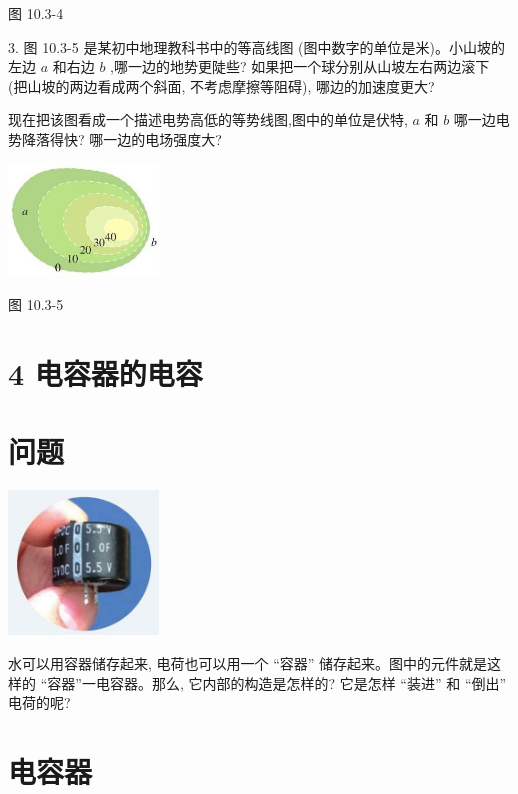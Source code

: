 \documentclass[10pt]{article}
\begin{document}
图 10.3-4

3. 图 10.3-5 是某初中地理教科书中的等高线图 (图中数字的单位是米)。小山坡的左边 \(a\) 和右边 \(b\) ,哪一边的地势更陡些? 如果把一个球分别从山坡左右两边滚下 (把山坡的两边看成两个斜面, 不考虑摩擦等阻碍), 哪边的加速度更大?

现在把该图看成一个描述电势高低的等势线图,图中的单位是伏特, \(a\) 和 \(b\) 哪一边电势降落得快? 哪一边的电场强度大?

\begin{center}
\includegraphics[max width=0.3\textwidth]{images/01911d5f-8e38-70c0-b5b8-2b399bd115b6_42_120700.jpg}
\end{center}

图 10.3-5

\section*{4 电容器的电容}

\section*{问题}

\begin{center}
\includegraphics[max width=0.3\textwidth]{images/01911d5f-8e38-70c0-b5b8-2b399bd115b6_43_812922.jpg}
\end{center}

水可以用容器储存起来, 电荷也可以用一个 “容器” 储存起来。图中的元件就是这样的 “容器”一电容器。那么, 它内部的构造是怎样的? 它是怎样 “装进” 和 “倒出” 电荷的呢?

\section*{电容器}
\end{document}

